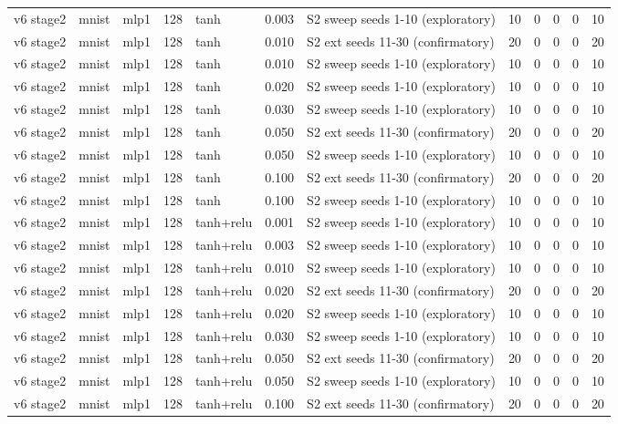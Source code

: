 \begin{table}[htbp]
{\begin{tabular}{@{}lllrlrlrrrrr@{}}
v6 stage2 & mnist & mlp1 & 128 & tanh & 0.003 & S2 sweep seeds 1-10 (exploratory) & 10 & 0 & 0 & 0 & 10 \\
v6 stage2 & mnist & mlp1 & 128 & tanh & 0.010 & S2 ext seeds 11-30 (confirmatory) & 20 & 0 & 0 & 0 & 20 \\
v6 stage2 & mnist & mlp1 & 128 & tanh & 0.010 & S2 sweep seeds 1-10 (exploratory) & 10 & 0 & 0 & 0 & 10 \\
v6 stage2 & mnist & mlp1 & 128 & tanh & 0.020 & S2 sweep seeds 1-10 (exploratory) & 10 & 0 & 0 & 0 & 10 \\
v6 stage2 & mnist & mlp1 & 128 & tanh & 0.030 & S2 sweep seeds 1-10 (exploratory) & 10 & 0 & 0 & 0 & 10 \\
v6 stage2 & mnist & mlp1 & 128 & tanh & 0.050 & S2 ext seeds 11-30 (confirmatory) & 20 & 0 & 0 & 0 & 20 \\
v6 stage2 & mnist & mlp1 & 128 & tanh & 0.050 & S2 sweep seeds 1-10 (exploratory) & 10 & 0 & 0 & 0 & 10 \\
v6 stage2 & mnist & mlp1 & 128 & tanh & 0.100 & S2 ext seeds 11-30 (confirmatory) & 20 & 0 & 0 & 0 & 20 \\
v6 stage2 & mnist & mlp1 & 128 & tanh & 0.100 & S2 sweep seeds 1-10 (exploratory) & 10 & 0 & 0 & 0 & 10 \\
v6 stage2 & mnist & mlp1 & 128 & tanh+relu & 0.001 & S2 sweep seeds 1-10 (exploratory) & 10 & 0 & 0 & 0 & 10 \\
v6 stage2 & mnist & mlp1 & 128 & tanh+relu & 0.003 & S2 sweep seeds 1-10 (exploratory) & 10 & 0 & 0 & 0 & 10 \\
v6 stage2 & mnist & mlp1 & 128 & tanh+relu & 0.010 & S2 sweep seeds 1-10 (exploratory) & 10 & 0 & 0 & 0 & 10 \\
v6 stage2 & mnist & mlp1 & 128 & tanh+relu & 0.020 & S2 ext seeds 11-30 (confirmatory) & 20 & 0 & 0 & 0 & 20 \\
v6 stage2 & mnist & mlp1 & 128 & tanh+relu & 0.020 & S2 sweep seeds 1-10 (exploratory) & 10 & 0 & 0 & 0 & 10 \\
v6 stage2 & mnist & mlp1 & 128 & tanh+relu & 0.030 & S2 sweep seeds 1-10 (exploratory) & 10 & 0 & 0 & 0 & 10 \\
v6 stage2 & mnist & mlp1 & 128 & tanh+relu & 0.050 & S2 ext seeds 11-30 (confirmatory) & 20 & 0 & 0 & 0 & 20 \\
v6 stage2 & mnist & mlp1 & 128 & tanh+relu & 0.050 & S2 sweep seeds 1-10 (exploratory) & 10 & 0 & 0 & 0 & 10 \\
v6 stage2 & mnist & mlp1 & 128 & tanh+relu & 0.100 & S2 ext seeds 11-30 (confirmatory) & 20 & 0 & 0 & 0 & 20 \\

\end{tabular}}
\end{table}
